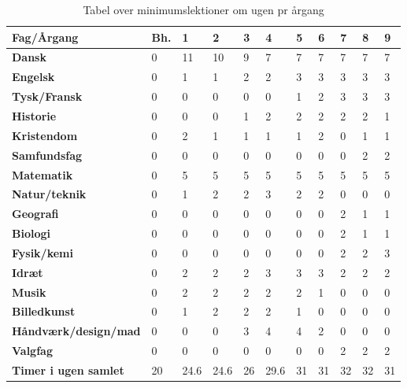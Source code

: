\begin{table}[h!]
\centering
\begin{tabular}{|l|l|l|l|l|l|l|l|l|l|l|}
\hline
\textbf{Fag/Årgang}                 & \textbf{Bh.} & \textbf{1} & \textbf{2} & \textbf{3} & \textbf{4} & \textbf{5} & \textbf{6} & \textbf{7} & \textbf{8} & \textbf{9} \\ \hline
\textbf{Dansk}                      & 0   & 11   & 10   & 9    & 7    & 7    & 7    & 7    & 7    & 7    \\ \hline
\textbf{Engelsk}                    & 0   & 1    & 1    & 2    & 2    & 3    & 3    & 3    & 3    & 3    \\ \hline
\textbf{Tysk/Fransk}                & 0   & 0    & 0    & 0    & 0    & 1    & 2    & 3    & 3    & 3    \\ \hline
\textbf{Historie}                   & 0   & 0    & 0    & 1    & 2    & 2    & 2    & 2    & 2    & 1    \\ \hline
\textbf{Kristendom}                 & 0   & 2    & 1    & 1    & 1    & 1    & 2    & 0    & 1    & 1    \\ \hline
\textbf{Samfundsfag}                & 0   & 0    & 0    & 0    & 0    & 0    & 0    & 0    & 2    & 2    \\ \hline
\textbf{Matematik}                  & 0   & 5    & 5    & 5    & 5    & 5    & 5    & 5    & 5    & 5    \\ \hline
\textbf{Natur/teknik}               & 0   & 1    & 2    & 2    & 3    & 2    & 2    & 0    & 0    & 0    \\ \hline
\textbf{Geografi}                   & 0   & 0    & 0    & 0    & 0    & 0    & 0    & 2    & 1    & 1    \\ \hline
\textbf{Biologi}                    & 0   & 0    & 0    & 0    & 0    & 0    & 0    & 2    & 1    & 1    \\ \hline
\textbf{Fysik/kemi}                 & 0   & 0    & 0    & 0    & 0    & 0    & 0    & 2    & 2    & 3    \\ \hline
\textbf{Idræt}                      & 0   & 2    & 2    & 2    & 3    & 3    & 3    & 2    & 2    & 2    \\ \hline
\textbf{Musik}                      & 0   & 2    & 2    & 2    & 2    & 2    & 1    & 0    & 0    & 0    \\ \hline
\textbf{Billedkunst}                & 0   & 1    & 2    & 2    & 2    & 1    & 0    & 0    & 0    & 0    \\ \hline
\textbf{Håndværk/design/mad} & 0   & 0    & 0    & 3    & 4    & 4    & 2    & 0    & 0    & 0    \\ \hline
\textbf{Valgfag}                    & 0   & 0    & 0    & 0    & 0    & 0    & 0    & 2    & 2    & 2    \\ \hline
\textbf{Timer i ugen samlet}        & 20  & 24.6 & 24.6 & 26   & 29.6 & 31   & 31   & 32   & 32   & 31   \\ \hline
\end{tabular}
\caption{Tabel over minimumslektioner om ugen pr årgang}
\label{tab:lektioner_pr_uge}
\end{table}


